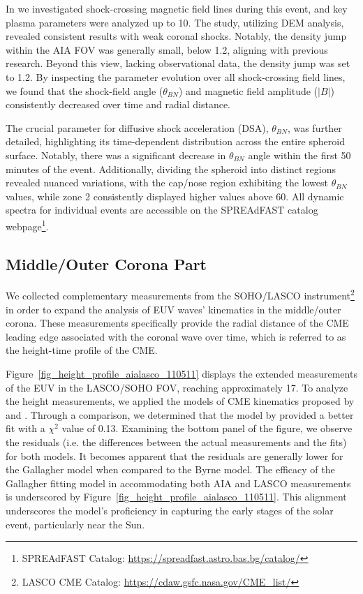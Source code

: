 In \citet{kozarev_2022} we investigated shock-crossing magnetic field lines during this event, and key plasma parameters were analyzed up to 10\rsun. The study, utilizing DEM analysis, revealed consistent results with weak coronal shocks. Notably, the density jump within the AIA FOV was generally small, below 1.2, aligning with previous research. Beyond this view, lacking observational data, the density jump was set to 1.2.
By inspecting the parameter evolution over all shock-crossing field lines, we found that the shock-field angle ($\theta_{BN}$) and magnetic field amplitude ($|B|$) consistently decreased over time and radial distance.

The crucial parameter for diffusive shock acceleration (DSA), $\theta_{BN}$, was further detailed, highlighting its time-dependent distribution across the entire spheroid surface. Notably, there was a significant decrease in $\theta_{BN}$ angle within the first 50 minutes of the event. Additionally, dividing the spheroid into distinct regions revealed nuanced variations, with the cap/nose region exhibiting the lowest $\theta_{BN}$ values, while zone 2 consistently displayed higher values above 60\degree. All dynamic spectra for individual events are accessible on the SPREAdFAST catalog webpage\footnote{SPREAdFAST Catalog: \url{https://spreadfast.astro.bas.bg/catalog/}}.

\subsection{Middle/Outer Corona Part}
We collected complementary measurements from the SOHO/LASCO instrument\footnote{LASCO CME Catalog: \url{https://cdaw.gsfc.nasa.gov/CME_list/}} in order to expand the analysis of EUV waves' kinematics in the middle/outer corona. These measurements specifically provide the radial distance of the CME leading edge associated with the coronal wave over time, which is referred to as the height-time profile of the CME.

Figure~\ref{fig_height_profile_aialasco_110511} displays the extended measurements of the EUV in the LASCO/SOHO FOV, reaching approximately 17\rsun. To analyze the height measurements, we applied the models of CME kinematics proposed by \citet{byrne_2013} and \citet{gallagher_2003}. Through a comparison, we determined that the model by \citet{gallagher_2003} provided a better fit with a $\chi^2$ value of 0.13. Examining the bottom panel of the figure, we observe the residuals (i.e. the differences between the actual measurements and the fits) for both models. It becomes apparent that the residuals are generally lower for the Gallagher model when compared to the Byrne model.
The efficacy of the Gallagher fitting model in accommodating both AIA and LASCO measurements is underscored by Figure~\ref{fig_height_profile_aialasco_110511}. This alignment underscores the model's proficiency in capturing the early stages of the solar event, particularly near the Sun.

